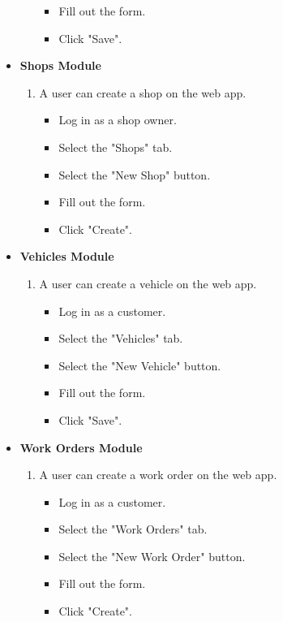 \documentclass[12pt, titlepage]{article}
\begin{document}
\begin{itemize}
\begin{enumerate}
\begin{itemize}
            \item Fill out the form.
            \item Click "Save".
        \end{itemize}
    \end{enumerate}
    \item \textbf{Shops Module}
    \begin{enumerate}
        \item A user can create a shop on the web app.
        \begin{itemize}
            \item Log in as a shop owner.
            \item Select the "Shops" tab.
            \item Select the "New Shop" button.
            \item Fill out the form.
            \item Click "Create".
        \end{itemize}
    \end{enumerate}
    \item \textbf{Vehicles Module}
    \begin{enumerate}
        \item A user can create a vehicle on the web app.
        \begin{itemize}
            \item Log in as a customer.
            \item Select the "Vehicles" tab.
            \item Select the "New Vehicle" button.
            \item Fill out the form.
            \item Click "Save".
        \end{itemize}
    \end{enumerate}
    \item \textbf{Work Orders Module}
    \begin{enumerate}
        \item A user can create a work order on the web app.
        \begin{itemize}
            \item Log in as a customer.
            \item Select the "Work Orders" tab.
            \item Select the "New Work Order" button.
            \item Fill out the form.
            \item Click "Create".

\end{itemize}
\end{enumerate}
\end{itemize}
\end{document}
